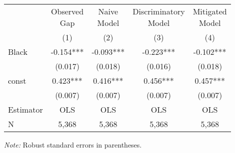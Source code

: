 \begin{tabular}{lcccc}
\toprule
 &  \makecell{Observed \\ Gap} & \makecell{Naive \\ Model} &    \makecell{Discriminatory \\ Model} &   \makecell{Mitigated \\ Model}  \\
\cline{2-5}
{} &        (1) &        (2) &        (3) &         (4) \\
\midrule
Black              &  -0.154*** &  -0.093*** &  -0.223*** &   -0.102*** \\
                   &    (0.017) &    (0.018) &    (0.016) &     (0.018) \\
const              &   0.423*** &   0.416*** &   0.456*** &    0.457*** \\
                   &    (0.007) &    (0.007) &    (0.007) &     (0.007) \\
\midrule
Estimator          &        OLS &        OLS &        OLS &         OLS \\
\midrule
N                  &      5,368 &      5,368 &      5,368 &       5,368 \\
\bottomrule
\end{tabular}

\noindent \textit{Note:} Robust standard errors in parentheses.